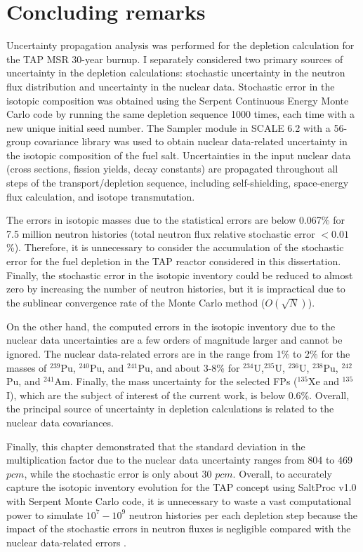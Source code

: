 \section{Concluding remarks}
Uncertainty propagation analysis was performed for the depletion calculation 
for the \gls{TAP} \gls{MSR} 30-year burnup. I separately considered two 
primary sources of uncertainty in the depletion calculations: stochastic 
uncertainty in the neutron flux distribution and uncertainty in the nuclear 
data. Stochastic error in the isotopic composition was obtained using the 
Serpent Continuous Energy Monte Carlo code by running the same depletion 
sequence 1000 times, each time with a new unique initial seed number. The 
Sampler module in SCALE 6.2 with a 56-group covariance library was used to 
obtain nuclear data-related uncertainty in the isotopic composition of the 
fuel salt. 
Uncertainties in the input nuclear data (cross sections, fission yields, decay 
constants) are propagated throughout all steps of the transport/depletion 
sequence, including self-shielding, space-energy flux calculation, and isotope 
transmutation. 

The errors in isotopic masses due to the statistical errors are below 0.067\% 
for 7.5 million neutron histories (total neutron flux relative stochastic 
error $<0.01$\%). Therefore, it is unnecessary to consider the accumulation of 
the stochastic error for the fuel depletion in the \gls{TAP} reactor 
considered in this dissertation.
Finally, the stochastic error in the isotopic inventory could be reduced to 
almost zero by increasing the number of neutron histories, but it is 
impractical due to the sublinear convergence rate of the Monte Carlo method 
($O(\sqrt{N})$).

On the other hand, the computed errors in the isotopic inventory due to the 
nuclear data uncertainties are a few orders of magnitude larger and cannot 
be ignored. The nuclear data-related errors are in the range from 1\% to 2\% 
for the masses of $^{239}$Pu, $^{240}$Pu, and $^{241}$Pu, and about 3-8\% for  
$^{234}$U,$^{235}$U, $^{236}$U, $^{238}$Pu, $^{242}$Pu, and $^{241}$Am. 
Finally, the mass uncertainty for the selected \glspl{FP} ($^{135}$Xe and 
$^{135}$I), which are the subject of interest of the current work, is below 
0.6\%. Overall, the principal source of uncertainty in depletion calculations 
is related to the nuclear data covariances.

Finally, this chapter demonstrated that the standard deviation in the 
multiplication factor due to the nuclear data uncertainty ranges from 804 to 
469 $pcm$, while the stochastic error is only about 30 $pcm$. Overall, to 
accurately capture the isotopic inventory evolution for the \gls{TAP} concept 
using SaltProc v1.0 with Serpent Monte Carlo code, it is unnecessary to 
waste a vast computational power to simulate $10^7-10^9$ neutron histories per 
each depletion step because the impact of the stochastic errors in 
neutron fluxes is negligible compared with the nuclear data-related errors .